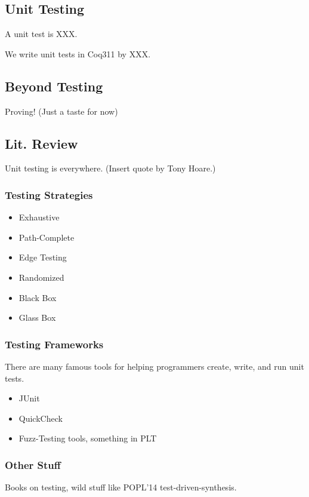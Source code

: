 \documentclass{article}
\begin{document}
\subsection*{Unit Testing}
A unit test is XXX.

We write unit tests in Coq311 by XXX.


\subsection*{Beyond Testing}
Proving!
(Just a taste for now)

\subsection*{Lit. Review}
Unit testing is everywhere.
(Insert quote by Tony Hoare.)

\subsubsection*{Testing Strategies}
\begin{itemize}
\item Exhaustive
\item Path-Complete
\item Edge Testing
\item Randomized
\item Black Box
\item Glass Box
\end{itemize}

\subsubsection*{Testing Frameworks}
There are many famous tools for helping programmers create, write, and run unit tests.
\begin{itemize}
\item JUnit
\item QuickCheck
\item Fuzz-Testing tools, something in PLT
\end{itemize}

\subsubsection*{Other Stuff}
Books on testing, wild stuff like POPL'14 test-driven-synthesis.
\end{document}
